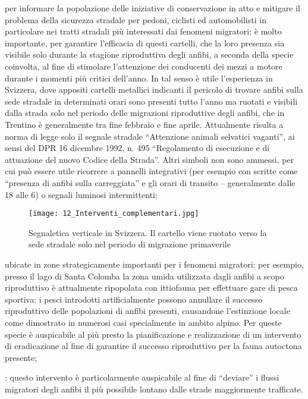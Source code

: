 \documentclass[11pt,a4paper,twoside]{memoir}
\begin{document}
\begin{description}\itemsep0pt
  \item[la posa di segnaletica stradale verticale] per informare la popolazione delle iniziative di conservazione in atto e mitigare il problema della sicurezza stradale per pedoni, ciclisti ed automobilisti in particolare nei tratti stradali più interessati dai fenomeni migratori: è molto importante, per garantire l'efficacia di questi cartelli, che la loro presenza sia visibile solo durante la stagione riproduttiva degli anfibi, a seconda della specie coinvolta, al fine di stimolare l'attenzione dei conducenti dei mezzi a motore durante i momenti più critici dell’anno. In tal senso è utile l’esperienza in Svizzera, dove appositi cartelli metallici indicanti il pericolo di trovare anfibi sulla sede stradale in determinati orari sono presenti tutto l’anno ma ruotati e visibili dalla strada solo nel periodo delle migrazioni riproduttive degli anfibi, che in Trentino è generalmente tra fine febbraio e fine aprile. Attualmente risulta a norma di legge solo il segnale stradale “Attenzione animali selvatici vaganti”, ai sensi del DPR 16 dicembre 1992, n. 495 “Regolamento di esecuzione e di attuazione del nuovo Codice della Strada”. Altri simboli non sono ammessi, per cui può essere utile ricorrere a pannelli integrativi (per esempio con scritte come “presenza di anfibi sulla carreggiata” e gli orari di transito – generalmente dalle 18 alle 6) o segnali luminosi intermittenti;
  \begin{figure}[H]
    \label{fig:comple}
    \centering
      \texttt{[image: 12\_Interventi\_complementari.jpg]}
    \caption{Segnaletica verticale in Svizzera. Il cartello viene ruotato verso la sede stradale solo nel periodo di migrazione primaverile}
  \end{figure}
  \item[recupero e/o gestione di zone umide] ubicate in zone strategicamente importanti per i fenomeni migratori: per esempio, presso il lago di Santa Colomba la zona umida utilizzata dagli anfibi a scopo riproduttivo è attualmente ripopolata con ittiofauna per effettuare gare di pesca sportiva: i pesci introdotti artificialmente possono annullare il successo riproduttivo delle popolazioni di anfibi presenti, causandone l’estinzione locale come dimostrato in numerosi casi specialmente in ambito alpino. Per queste specie è auspicabile al più presto la pianificazione e realizzazione di un intervento di eradicazione al fine di garantire il successo riproduttivo per la fauna autoctona presente;
  \item[realizzazione di siti riproduttivi alternativi]: questo intervento è particolarmente auspicabile al fine di “deviare” i flussi migratori degli anfibi il più possibile lontano dalle strade maggiormente trafficate.
\end{description}
\end{document}
